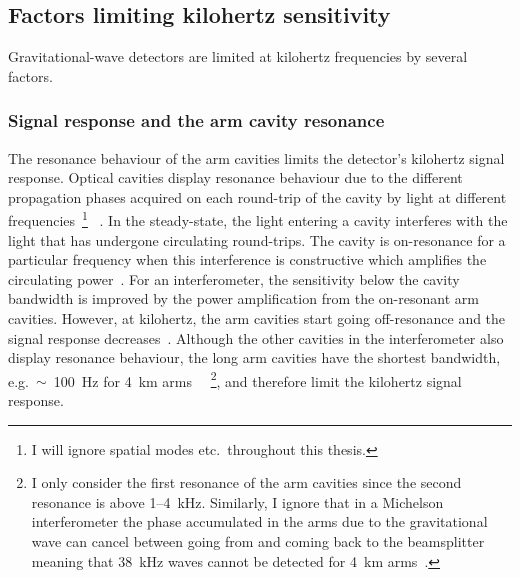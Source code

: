 \subsection{Factors limiting kilohertz sensitivity}
\label{sec:intro_factors_limiting_kHz}

Gravitational-wave detectors are limited at kilohertz frequencies by several factors.

\subsubsection{Signal response and the arm cavity resonance}

The resonance behaviour of the arm cavities limits the detector's kilohertz signal response.
Optical cavities display resonance behaviour due to the different propagation phases acquired on each round-trip of the cavity by light at different frequencies~\footnote{I will ignore spatial modes etc.\ throughout this thesis.}~\cite{} . In the steady-state, the light entering a cavity interferes with the light that has undergone circulating round-trips. The cavity is on-resonance for a particular frequency when this interference is constructive which amplifies the circulating power~\cite{}. %
For an interferometer, the sensitivity below the cavity bandwidth is improved by the power amplification from the on-resonant arm cavities. However, at kilohertz, the arm cavities start going off-resonance and the signal response decreases~\cite{}. %
Although the other cavities in the interferometer also display resonance behaviour, the long arm cavities have the shortest bandwidth, e.g.\ $\sim$~100~Hz for 4~km arms ~\cite{}~\footnote{I only consider the first resonance of the arm cavities since the second resonance is above 1--4~kHz. Similarly, I ignore that in a Michelson interferometer the phase accumulated in the arms due to the gravitational wave can cancel between going from and coming back to the beamsplitter meaning that 38~kHz waves cannot be detected for 4~km arms~\cite{}.}, and therefore limit the kilohertz signal response.

